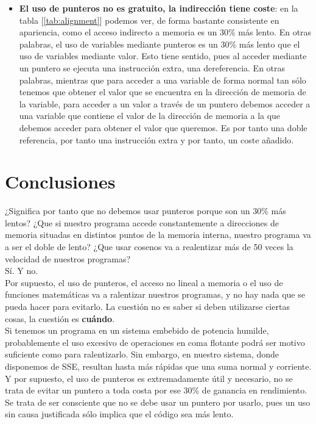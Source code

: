 \begin{itemize}
	\item \textbf{El uso de punteros no es gratuito, la indirección tiene coste}: en la tabla [\ref{tab:alignment}] podemos ver, de forma bastante consistente en apariencia, como el acceso indirecto a memoria es un 30\% más lento. En otras palabras, el uso de variables mediante punteros es un 30\% más lento que el uso de variables mediante valor. Esto tiene sentido, pues al acceder mediante un puntero se ejecuta una instrucción extra, una dereferencia. En otras palabras, mientras que para acceder a una variable de forma normal tan sólo tenemos que obtener el valor que se encuentra en la dirección de memoria de la variable, para acceder a un valor a través de un puntero debemos acceder a una variable que contiene el valor de la dirección de memoria a la que debemos acceder para obtener el valor que queremos. Es por tanto una doble referencia, por tanto una instrucción extra y por tanto, un coste añadido.
\end{itemize}

\section{Conclusiones}

¿Significa por tanto que no debemos usar punteros porque son un 30\% más lentos? ¿Que si nuestro programa accede constantemente a direcciones de memoria situadas en distintos puntos de la memoria interna, nuestro programa va a ser el doble de lento? ¿Que usar cosenos va a realentizar más de 50 veces la velocidad de nuestros programas?\\

Sí. Y no.\\

Por supuesto, el uso de punteros, el acceso no lineal a memoria o el uso de funciones matemáticas va a ralentizar nuestros programas, y no hay nada que se pueda hacer para evitarlo. La cuestión no es saber si deben utilizarse ciertas cosas, la cuestión es \textbf{cuándo}.\\

Si tenemos un programa en un sistema embebido de potencia humilde, probablemente el uso excesivo de operaciones en coma flotante podrá ser motivo suficiente como para ralentizarlo. Sin embargo, en nuestro sistema, donde disponemos de SSE, resultan hasta más rápidas que una suma normal y corriente.\\

Y por supuesto, el uso de punteros es extremadamente útil y necesario, no se trata de evitar un puntero a toda costa por ese 30\% de ganancia en rendimiento. Se trata de ser consciente que no se debe usar un puntero por usarlo, pues un uso sin causa justificada sólo implica que el código sea más lento.\\

